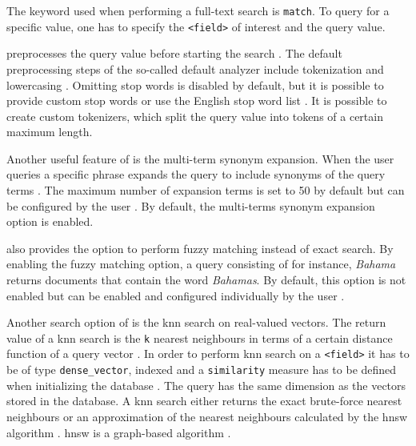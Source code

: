 The keyword used when performing a full-text search is \texttt{match}.
To query for a specific value, one has to specify the \texttt{<field>} of interest and the query value.

\databaseName{} preprocesses the query value before starting the search \cite{Elasticsearch-text-analyser}.
The default preprocessing steps of the so-called default analyzer include tokenization and lowercasing \cite{Elasticsearch-text-analyser}. 
Omitting stop words is disabled by default, but it is possible to provide custom stop words or use the English stop word list \cite{Elasticsearch-text-analyser}.
It is possible to create custom tokenizers, which split the query value into tokens of a certain maximum length.

Another useful feature of \databaseName{} is the multi-term synonym expansion.
When the user queries a specific phrase \databaseName{} expands the query to include synonyms of the query terms \cite{Elasticsearch-synonyms}.
The maximum number of expansion terms is set to 50 by default but can be configured by the user \cite{Elasticsearch-match}.
By default, the multi-terms synonym expansion option is enabled.

\databaseName{} also provides the option to perform fuzzy matching instead of exact search.
By enabling the fuzzy matching option, a \databaseName{} query consisting of for instance, \textit{Bahama} returns documents that contain the word \textit{Bahamas}.
By default, this option is not enabled but can be enabled and configured individually by the user \cite{Elasticsearch-match}.


Another search option of \databaseName{} is the \ac{knn} search on real-valued vectors.
The return value of a \ac{knn} search is the \texttt{k} nearest neighbours in terms of a certain distance function of a query vector \cite{Elasticsearch-kNN-HNSW}.
In order to perform \ac{knn} search on a \texttt{<field>} it has to be of type \texttt{dense\_vector}, 
indexed and a \texttt{similarity} measure has to be defined when initializing the database \cite{Elasticsearch-knn}.
The query has the same dimension as the vectors stored in the database.
A \ac{knn} search either returns the exact brute-force nearest neighbours or 
an approximation of the nearest neighbours calculated by the \ac{hnsw} algorithm \cite{Elasticsearch-kNN-HNSW, Elasticsearch-knn}.
\ac{hnsw} is a graph-based algorithm \cite{Elasticsearch-kNN-HNSW}.

